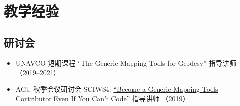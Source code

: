 \section{教学经验}

\subsection{研讨会}
\begin{itemize}
\item UNAVCO 短期课程 ``The Generic Mapping Tools for Geodesy'' 指导讲师（2019--2021）
\item AGU 秋季会议研讨会 SCIWS4: \href{https://www.agu.org/Events/SCIWS4-Generic-Mapping-Tools}{``Become a Generic Mapping Tools Contributor Even If You Can't Code''} 指导讲师 （2019）
\end{itemize}
